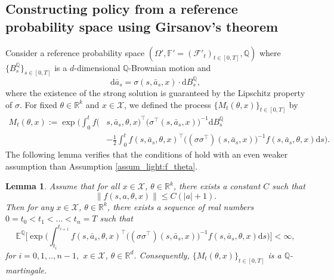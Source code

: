 \documentclass{article}
\newtheorem{lem}[thm]{Lemma}
\newcommand{\1}{\mathbbm{1}}
\numberwithin{equation}{section}
\def\cF{\mathcal{F}}
\def\cX{\mathcal{X}}
\def\d{{\mathrm{d}}}
\def\sE{{\mathbb{E}}}
\def\sF{{\mathbb{F}}}
\def\sQ{{\mathbb{Q}}}
\def\sR{{\mathbb R}}
\begin{document}
\subsection{Constructing policy from a reference probability space using Girsanov's theorem }
Consider a reference probability space $(\Omega', \sF'=(\cF'_t)_{t\in[0,T]},\mathbb{Q})$ where $\{B_s^\sQ\}_{s\in[0,T]}$ is a $d$-dimensional $\sQ$-Brownian motion and 
\begin{equation}\label{diffusion:Q}
    \d \bar a_s =\sigma(s,\bar a_s,x)\cdot \d B^{\sQ}_s,    
\end{equation}
where the existence of the strong solution is guaranteed by the Lipschitz property of $\sigma$. For fixed $\theta\in\sR^k$ and $x\in\cX$, we defined the process $\{M_t(\theta,x)\}_{t\in[0,T]}$ by 
\begin{equation}\label{def:m}
    \begin{aligned}M_t(\theta,x):=\exp\Big(\int_0^tf(&s, \bar a_s,\theta,x)^\top\big(\sigma^\top(s,\bar a_s,x)\big)^{-1}\d B^\sQ_s
    \\
    &-\frac12\int_0^t{f(s, \bar  a_s,\theta,x)^\top}\big((\sigma\sigma^\top)(s,\bar a_s,x)\big)^{-1}f(s, \bar a_s,\theta,x)\d s\Big).
    \end{aligned}
\end{equation}
The following lemma verifies that the conditions of \cite[Corollary 5.14 in Chapter 3]{karatzas1991brownian} hold with an even weaker assumption than Assumption \ref{assum_light:f_theta}.
\begin{lem}\label{lem:mtgcond}
    Assume that for all $x\in\cX$, $\theta\in\sR^k$, there exists a constant $C$ such that 
    $$
    \big\|f(s,a,\theta,x)\big\|\leq C (|a|+1).
    $$
    Then for any $x\in\cX$, $\theta\in\sR^k$, there exists a sequence of real numbers $0=t_0<t_1<...<t_n=T$  such that
    $$
        \sE^\sQ\bigg[\exp\bigg(\int_{t_i}^{t_{i+1}}f(s, \bar a_s,\theta,x)^\top\big((\sigma\sigma^\top)(s,\bar a_s,x)\big)^{-1}f(s, \bar a_s,\theta,x)\d s\bigg)\bigg]<\infty,
    $$
    for $i=0,1,..,n-1,$ $x\in\cX$, $\theta \in\sR^d$. Consequently, $\{M_t(\theta,x)\}_{t\in[0,T]}$ is a $\sQ$-martingale.
\end{lem}
\end{document}
